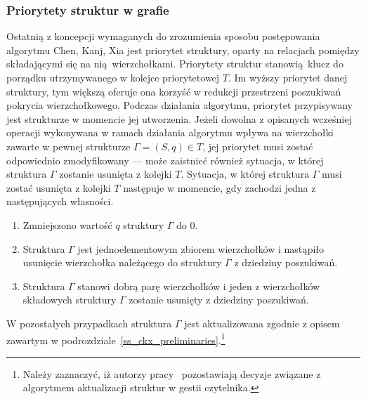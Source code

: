 \subsubsection{Priorytety struktur w grafie}
\label{sss_ckx_priorities}
\par{
  Ostatnią z koncepcji wymaganych do zrozumienia sposobu postępowania algorytmu Chen, Kanj, Xia jest priorytet struktury, oparty na relacjach pomiędzy składającymi się na nią wierzchołkami.
  Priorytety struktur stanowią klucz do porządku utrzymywanego w kolejce priorytetowej $T$.
  Im wyższy priorytet danej struktury, tym większą oferuje ona korzyść w redukcji przestrzeni poszukiwań pokrycia wierzchołkowego.
  Podczas działania algorytmu, priorytet przypisywany jest strukturze w momencie jej utworzenia.
  Jeżeli dowolna z opisanych wcześniej operacji wykonywana w ramach działania algorytmu wpływa na wierzchołki zawarte w pewnej strukturze $\Gamma=(S, q) \in T$, jej priorytet musi zostać odpowiednio zmodyfikowany --- może zaistnieć również sytuacja, w której struktura $\Gamma$ zostanie usunięta z kolejki $T$.
  Sytuacja, w której struktura $\Gamma$ musi zostać usunięta z kolejki $T$ następuje w momencie, gdy zachodzi jedna z następujących własności.
  \begin{enumerate}
    \item Zmniejszono wartość $q$ struktury $\Gamma$ do $0$.
    \item Struktura $\Gamma$ jest jednoelementowym zbiorem wierzchołków i nastąpiło usunięcie wierzchołka należącego do struktury $\Gamma$ z dziedziny poszukiwań.
    \item Struktura $\Gamma$ stanowi dobrą parę wierzchołków i jeden z wierzchołków składowych struktury $\Gamma$ zostanie usunięty z dziedziny poszukiwań.
  \end{enumerate}
  
  W pozostałych przypadkach struktura $\Gamma$ jest aktualizowana zgodnie z opisem zawartym w podrozdziale~\ref{ss_ckx_preliminaries}.\footnote{Należy zaznaczyć, iż autorzy pracy~\cite{ImprovedBounds10} pozostawiają decyzje związane z algorytmem aktualizacji struktur w gestii czytelnika.}

}
